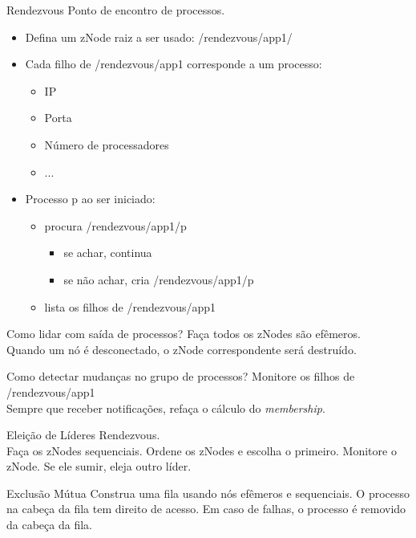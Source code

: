 \begin{frame}{Rendezvous}
Ponto de encontro de processos. \pause

\begin{itemize}
	\item Defina um zNode raiz a ser usado: /rendezvous/app1/ \pause
	\item Cada filho de /rendezvous/app1 corresponde a um processo:
		\begin{itemize}
			\item IP
			\item Porta
			\item Número de processadores
			\item ...
		\end{itemize}
	\item Processo p ao ser iniciado:
		\begin{itemize}
			\item procura /rendezvous/app1/p
			\begin{itemize}
				\item se achar, continua
				\item se não achar, cria /rendezvous/app1/p
			\end{itemize}
			\item lista os filhos de /rendezvous/app1
		\end{itemize}
\end{itemize}
\end{frame}

\begin{frame}{Como lidar com saída de processos?}
\pause Faça todos os zNodes são efêmeros. \\
Quando um nó é desconectado, o zNode correspondente será destruído.
\end{frame}

\begin{frame}{Como detectar mudanças no grupo de processos?}
Monitore os filhos de /rendezvous/app1\\
Sempre que receber notificações, refaça o cálculo do \emph{membership}.
\end{frame}

\begin{frame}{Eleição de Líderes}
\pause Rendezvous.\\
\pause Faça os zNodes sequenciais.
\pause Ordene os zNodes e escolha o primeiro.
\pause Monitore o zNode. Se ele sumir, eleja outro líder.
\end{frame}

\begin{frame}{Exclusão Mútua}
Construa uma fila usando nós efêmeros e sequenciais. O processo na cabeça da fila tem direito de acesso. Em caso de falhas, o processo é removido da cabeça da fila.
\end{frame}


